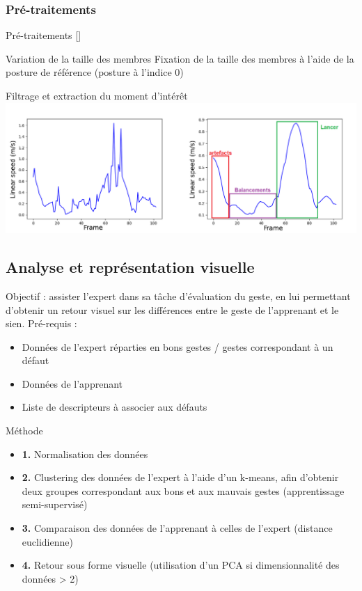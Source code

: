 \documentclass[svgnames]{beamer}
\newcommand{\mycite}[1]{[\textit{\cite{#1}}]}
\begin{document}
	\subsubsection{Pré-traitements}
	\begin{frame}{Pré-traitements \mycite{couland:hal-02002381}}
		\begin{block}{Variation de la taille des membres}
			Fixation de la taille des membres à l'aide de la posture de référence (posture à l'indice 0)
		\end{block}
		
	\begin{block}{Filtrage et extraction du moment d'intérêt}
		\centering
			\includegraphics[scale=0.35]{img/before_after_savgol_complete.png}
	\end{block}
		
	\end{frame}
	
	\subsection{Analyse et représentation visuelle}
	\begin{frame}{\subsecname}
	Objectif : assister l'expert dans sa tâche d'évaluation du geste, en lui permettant d'obtenir un retour visuel sur les différences entre le geste de l'apprenant et le sien.
	Pré-requis :
	\begin{itemize}[label=$\bullet$]
		\item Données de l'expert réparties en bons gestes / gestes correspondant à un défaut
		\item Données de l'apprenant
		\item Liste de descripteurs à associer aux défauts
	\end{itemize}
	\end{frame}
	
	\begin{frame}{Méthode}
	\begin{itemize}
		\item \textbf{1.} Normalisation des données
		\item \textbf{2.} Clustering des données de l'expert à l'aide d'un k-means, afin d'obtenir deux groupes correspondant aux bons et aux mauvais gestes (apprentissage semi-supervisé)
		\item \textbf{3.} Comparaison des données de l'apprenant à celles de l'expert (distance euclidienne)
		\item \textbf{4.} Retour sous forme visuelle (utilisation d'un PCA si dimensionnalité des données > 2)
	\end{itemize}
	
	\end{frame}
	
\end{document}
